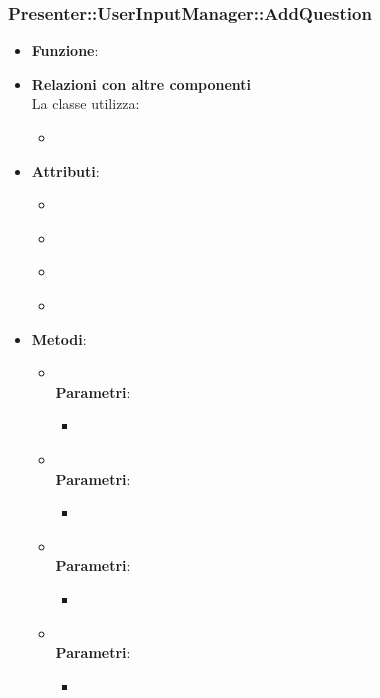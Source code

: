 \subsubsection{Presenter::UserInputManager::AddQuestion}\begin{itemize}
\item\textbf{Funzione}:
\item\textbf{Relazioni con altre componenti}\\
La classe utilizza:
	\begin{itemize}
		\item
	\end{itemize}
\item\textbf{Attributi}:
	\begin{itemize}
		\item\code{}\\
		\item\code{}\\
		\item\code{}\\
		\item\code{}\\
	\end{itemize}
\item\textbf{Metodi}:
	\begin{itemize}
		\item\code{}\\
		\textbf{Parametri}:
			\begin{itemize}
				\item\code{}\\
			\end{itemize}
		\item\code{}\\
		\textbf{Parametri}:
			\begin{itemize}
				\item\code{}\\
			\end{itemize}
		\item\code{}\\
		\textbf{Parametri}:
			\begin{itemize}
				\item\code{}\\
			\end{itemize}
		\item\code{}\\
		\textbf{Parametri}:
			\begin{itemize}
				\item\code{}\\
			\end{itemize}
	\end{itemize}
\end{itemize}

